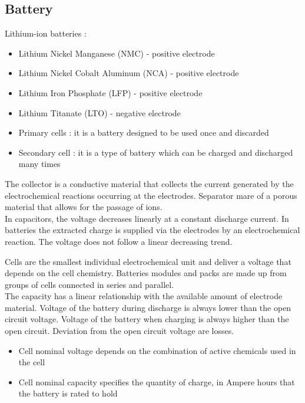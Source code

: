 \documentclass[../main.tex]{subfiles}
\begin{document}
\subsection{Battery}
Lithium-ion batteries : \begin{itemize}
    \item Lithium Nickel Manganese (NMC) - positive electrode
    \item Lithium Nickel Cobalt Aluminum (NCA) - positive electrode
    \item Lithium Iron Phosphate (LFP) - positive electrode
    \item Lithium Titanate (LTO) - negative electrode
\end{itemize}

\begin{itemize}
    \item Primary cells : it is a battery designed to be used once and discarded
    \item Secondary cell : it is a type of battery which can be charged and discharged many times
\end{itemize}

The collector is a conductive material that collects the current generated by the electrochemical reactions occurring at the electrodes. Separator mare of a porous material that allows for the passage of ions.\\

In capacitors, the voltage decreases linearly at a constant discharge current. In batteries the extracted charge is supplied via the electrodes by an electrochemical reaction. The voltage does not follow a linear decreasing trend.

Cells are the smallest individual electrochemical unit and deliver a voltage that depends on the cell chemistry. Batteries modules and packs are made up from groups of cells connected in series and parallel.\\

The capacity has a linear relationship with the available amount of electrode material. Voltage of the battery during discharge is always lower than the open circuit voltage. Voltage of the battery when charging is always higher than the open circuit. Deviation from the open circuit voltage are losses. \\

\begin{itemize}
    \item Cell nominal voltage depends on the combination of active chemicals used in the cell
    \item Cell nominal capacity specifies the quantity of charge, in Ampere hours that the battery is rated to hold
\end{itemize}
\end{document}

